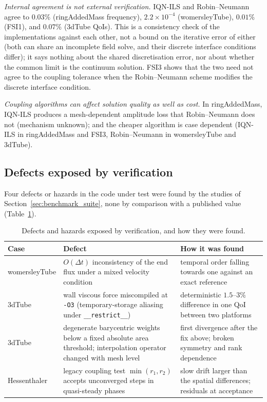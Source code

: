 \emph{Internal agreement is not external verification.}
IQN-ILS and Robin--Neumann agree to $0.03\%$ (ringAddedMass frequency), $2.2\times10^{-4}$ (womersleyTube), $0.01\%$ (FSI1), and $0.07\%$ (3dTube QoIs).
This is a consistency check of the implementations against each other, not a bound on the iterative error of either (both can share an incomplete field solve, and their discrete interface conditions differ); it says nothing about the shared discretisation error, nor about whether the common limit is the continuum solution.
FSI3 shows that the two need not agree to the coupling tolerance when the Robin--Neumann scheme modifies the discrete interface condition.

\emph{Coupling algorithms can affect solution quality as well as cost.}
In ringAddedMass, IQN-ILS produces a mesh-dependent amplitude loss that Robin--Neumann does not (mechanism unknown); and the cheaper algorithm is case dependent (IQN-ILS in ringAddedMass and FSI3, Robin--Neumann in womersleyTube and 3dTube).


\subsection{Defects exposed by verification}\label{sec:defects}

Four defects or hazards in the code under test were found by the studies of Section~\ref{sec:benchmark_suite}, none by comparison with a published value (Table~\ref{tab:defects}).

\begin{table}[htbp]
	\centering
	\footnotesize
	\setlength{\tabcolsep}{3pt}
	\caption{Defects and hazards exposed by verification, and how they were found.}
	\label{tab:defects}
	\begin{tabular}{p{2.6cm}p{5.6cm}p{5.6cm}}
		\toprule
		Case & Defect & How it was found \\
		\midrule
		womersleyTube & $O(\Delta t)$ inconsistency of the end flux under a mixed velocity condition & temporal order falling towards one against an exact reference \\
		3dTube & wall viscous force miscompiled at \texttt{-O3} (temporary-storage aliasing under \texttt{\_\_restrict\_\_}) & deterministic $1.5$--$3\%$ difference in one QoI between two platforms \\
		3dTube & degenerate barycentric weights below a fixed absolute area threshold; interpolation operator changed with mesh level & first divergence after the fix above; broken symmetry and rank dependence \\
		Hessenthaler & legacy coupling test $\min(r_1, r_2)$ accepts unconverged steps in quasi-steady phases & slow drift larger than the spatial differences; residuals at acceptance \\
		\bottomrule
	\end{tabular}
\end{table}

